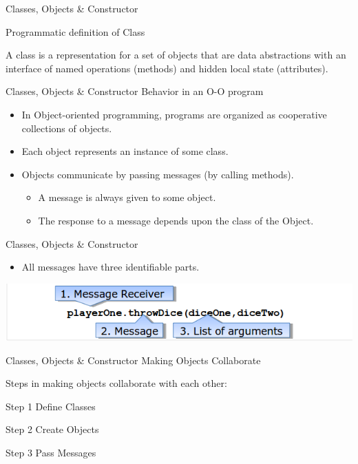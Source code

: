\documentclass[14pt]{beamer}
\begin{document}
\begin{frame}{Classes, Objects \& Constructor}
\begin{block}{}
    Programmatic definition of Class
\end{block}
A class is a representation for a set of objects that are data abstractions with an interface of named operations (methods) and hidden local state (attributes).
\end{frame}
\begin{frame}{Classes, Objects \& Constructor}
Behavior in an O-O program
\begin{itemize}
    \item In Object-oriented programming, programs are organized as cooperative collections of objects.
    \item Each object represents an instance of some class.
    \item Objects communicate by passing messages (by calling methods).
        \begin{itemize}
    \item A message is always given to some object. 
    \item The response to a message depends upon the class of the Object.
\end{itemize}
\end{itemize}
\end{frame}
\begin{frame}{Classes, Objects \& Constructor}

\begin{itemize}
\item All messages have three identifiable parts.
    \end{itemize}
    \begin{center}
        \includegraphics[scale=0.5]{COJ-M01-S03-Image10.png}
                    \end{center}
\end{frame}

\begin{frame}{Classes, Objects \& Constructor}
Making Objects Collaborate

\begin{block}{}
   Steps in making objects collaborate with each other:
\end{block}
\begin{block}{Step 1}
    Define Classes
\end{block}

\begin{block}{Step 2}
     Create Objects
    \end{block}

    \begin{block}{Step 3}
             Pass Messages
                 \end{block}

\end{frame}
\end{document}
